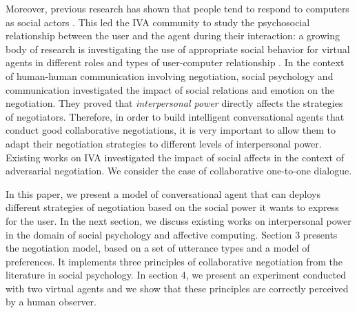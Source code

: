 \documentclass{llncs}
\begin{document}
	Moreover, previous research has shown that people tend to respond to computers as social actors \cite{bickmore2005establishing}. This led the IVA community to study the psychosocial relationship between the user and the agent during their interaction: a growing body of research is investigating the use of appropriate social behavior for virtual agents in different roles and types of user-computer relationship \cite{bickmore2005s,bickmore2005establishing,kidd2005sociable}. In the context of human-human communication involving negotiation, social psychology and communication \cite{dunbar2005perceptions,de1995impact} investigated the impact of social relations and emotion on the negotiation. They proved that  \emph{interpersonal power} directly affects the strategies of negotiators. Therefore, in order to build intelligent conversational agents that conduct good collaborative negotiations, it is very important to allow them to adapt their negotiation strategies to different levels of interpersonal power. Existing works on IVA \cite{traum2008multi,de2015humans,de2011effect}investigated the impact of social affects in the context of adversarial negotiation. We consider the case of collaborative one-to-one dialogue.
	
	In this paper, we present a model of conversational agent that can deploys different strategies of negotiation based on the social power it wants to express for the user. In the next section, we discuss existing works on interpersonal power in the domain of social psychology and affective computing. Section 3 presents the negotiation model, based on a set of utterance types and a model of preferences. It implements three principles of collaborative negotiation from the literature in social psychology. In section 4, we present an experiment conducted with two virtual agents and we show that these principles are correctly perceived by a human observer.	
	
\end{document}
